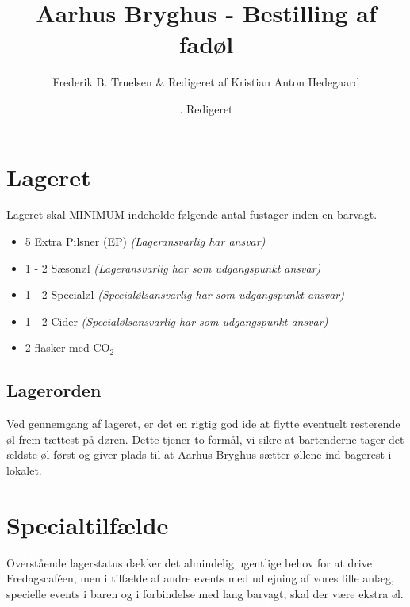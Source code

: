 

\usepackage{hyperref} 

\title{Aarhus Bryghus - Bestilling af fadøl}
\date{. Redigeret }
\author{Frederik B. Truelsen \& Redigeret af Kristian Anton Hedegaard}



\maketitle

\section{Lageret}

Lageret skal MINIMUM indeholde følgende antal fustager inden en barvagt.

\begin{itemize}
\item 5 Extra Pilsner (EP) \emph{(Lageransvarlig har ansvar)}
\item 1 - 2 Sæsonøl \emph{(Lageransvarlig har som udgangspunkt ansvar)}
\item 1 - 2 Specialøl \emph{(Specialølsansvarlig har som udgangspunkt ansvar)}
\item 1 - 2 Cider \emph{(Specialølsansvarlig har som udgangspunkt ansvar)}
\item 2 flasker med CO$_{2}$
\end{itemize}

\subsection{Lagerorden}

Ved gennemgang af lageret, er det en rigtig god ide at flytte eventuelt resterende øl frem tættest på døren.
Dette tjener to formål, vi sikre at bartenderne tager det ældste øl først og giver plads til at Aarhus Bryghus
sætter øllene ind bagerest i lokalet.

\section{Specialtilfælde}

Overstående lagerstatus dækker det almindelig ugentlige behov for at drive Fredagscaféen,
men i tilfælde af andre events med udlejning af vores lille anlæg, specielle events i baren og
i forbindelse med lang barvagt, skal der være ekstra øl.

